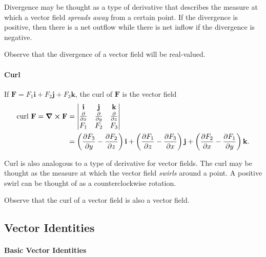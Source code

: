 Divergence may be thought as a type of derivative that describes the measure at which a vector field \textit{spreads away} from a certain point. If the divergence is positive, then there is a net outflow while there is net inflow if the divergence is negative. 

Observe that the divergence of a vector field will be real-valued.

\paragraph{Curl}
If \(\textbf{F} = F_1\textbf{i} + F_2\textbf{j} + F_3\textbf{k}\), the curl of \(\textbf{F}\) is the vector field
\begin{align*}
    \text{curl } \textbf{F} = \curl \textbf{F} & = 
    \begin{vmatrix}
        \textbf{i} & \textbf{j} & \textbf{k}\\
        \frac{\partial}{\partial x} & \frac{\partial}{\partial y} & \frac{\partial}{\partial z} \\
        F_1 & F_2 & F_3
    \end{vmatrix} \\
    & = \left( \frac{\partial F_3}{\partial y} - \frac{\partial F_2}{\partial z}\right)\textbf{i} + \left( \frac{\partial F_1}{\partial z} - \frac{\partial F_3}{\partial x}\right)\textbf{j} + \left( \frac{\partial F_2}{\partial x} - \frac{\partial F_1}{\partial y}\right)\textbf{k}.
\end{align*}

Curl is also analogous to a type of derivative for vector fields. The curl may be thought as the measure at which the vector field \textit{swirls} around a point. A positive swirl can be thought of as a counterclockwise rotation.

Observe that the curl of a vector field is also a vector field.

\subsection{Vector Identities}


\paragraph{Basic Vector Identities}

